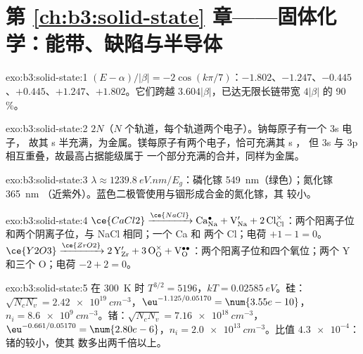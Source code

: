 \section*{第 \ref{ch:b3:solid-state} 章——固体化学：能带、缺陷与半导体}

\begin{solution}{exo:b3:solid-state:1}
$(E - \alpha)/|\beta| = -2\cos(k\pi/7)$：$-1.802$、$-1.247$、$-0.445$、$+0.445$、$+1.247$、$+1.802$。它们跨越
$3.604|\beta|$，已达无限长链带宽 $4|\beta|$ 的 90\,\%。
\end{solution}

\begin{solution}{exo:b3:solid-state:2}
$2N$（$N$ 个轨道，每个轨道两个电子）。钠每原子有一个 3s 电子，
故其 s 半充满，为金属。镁每原子有两个电子，恰可充满其 s ，
但 3s 与 3p 相互重叠，故最高占据能级属于
一个部分充满的合并，同样为金属。
\end{solution}

\begin{solution}{exo:b3:solid-state:3}
$\lambda \approx \qty{1239.8}{eV.nm}/E_g$：磷化镓 \qty{549}{nm}（绿色）；氮化镓 \qty{365}{nm}
（近紫外）。蓝色二极管使用与铟形成合金的氮化镓，其
较小。
\end{solution}

\begin{solution}{exo:b3:solid-state:4}
$\ce{CaCl2} \xrightarrow{\ce{NaCl}} \mathrm{Ca_{Na}^{\bullet} + V_{Na}' + 2\,Cl_{Cl}^{\times}}$：两个阳离子位和两个阴离子位，与 NaCl 相同；一个 Ca 和
两个 Cl；电荷 $+1 - 1 = 0$。$\ce{Y2O3} \xrightarrow{\ce{ZrO2}} \mathrm{2\,Y_{Zr}' + 3\,O_O^{\times} + V_O^{\bullet\bullet}}$：两个阳离子位和四个氧位；两个 Y
和三个 O；电荷 $-2 + 2 = 0$。
\end{solution}

\begin{solution}{exo:b3:solid-state:5}
在 \qty{300}{K} 时 $T^{3/2} = 5196$，$kT = \qty{0.02585}{eV}$。硅：$\sqrt{N_cN_v} = \qty{2.42e19}{cm^{-3}}$，$\eu^{-1.125/0.05170} = \num{3.55e-10}$，
$n_i = \qty{8.6e9}{cm^{-3}}$。锗：$\sqrt{N_cN_v} = \qty{7.16e18}{cm^{-3}}$，$\eu^{-0.661/0.05170} = \num{2.80e-6}$，$n_i = \qty{2.0e13}{cm^{-3}}$。比值
$\num{4.3e-4}$：锗的较小，使其
数多出两千倍以上。
\end{solution}

